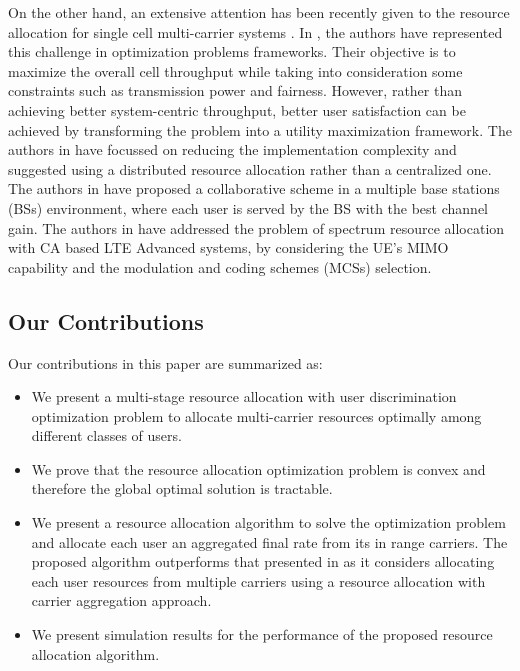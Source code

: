 \documentclass[journal]{IEEEtran} 				\IEEEoverridecommandlockouts 						\usepackage{amsmath,amssymb}
\begin{document}
On the other hand, an extensive attention has been recently given to the resource allocation for single cell multi-carrier systems \cite{Dual-Decomposition, Resource_allocation, Rate_Balancing}. In \cite{Fair_resource,Design_of_Fair,Fast_Algorithms,Optimal_and_near-optimal}, the authors have represented this challenge in optimization problems frameworks. Their objective is to maximize the overall cell throughput while taking into consideration some constraints such as transmission power and fairness. However, rather than achieving better system-centric throughput, better user satisfaction can be achieved by transforming the problem into a utility maximization framework. The authors in \cite{Downlink_dynamic,Centralized_vs_Distributed} have focussed on reducing the implementation complexity and suggested using a distributed resource allocation rather than a centralized one. The authors in \cite{Cooperative_Fair_Scheduling} have proposed a collaborative scheme in a multiple base stations (BSs) environment, where each user is served by the BS with the best channel gain. The authors in \cite{DownlinkRadio} have addressed the problem of spectrum resource allocation with CA based LTE Advanced systems, by considering the UE's MIMO capability and the modulation and coding schemes (MCSs) selection.
\subsection{Our Contributions}\label{sec:contributions}
Our contributions in this paper are summarized as:
\begin{itemize}
\item We present a multi-stage resource allocation with user discrimination optimization problem to allocate multi-carrier resources optimally among different classes of users.
\item We prove that the resource allocation optimization problem is convex and therefore the global optimal solution is tractable.
\item We present a resource allocation algorithm to solve the optimization problem and allocate each user an aggregated final rate from its in range carriers. The proposed algorithm outperforms that presented in \cite{Haya_Utility4} as it considers allocating each user resources from multiple carriers using a resource allocation with carrier aggregation approach.
\item We present simulation results for the performance of the proposed resource allocation algorithm.
\end{itemize}
\end{document}
